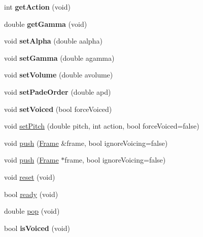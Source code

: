 \begin{DoxyCompactItemize}
\item 
\hypertarget{class_m_a_g_e_1_1_vocoder_ac0707389d3fcb19a1acc4e44ef5b2d94}{int {\bfseries get\-Action} (void)}\label{class_m_a_g_e_1_1_vocoder_ac0707389d3fcb19a1acc4e44ef5b2d94}

\item 
\hypertarget{class_m_a_g_e_1_1_vocoder_aa69d3116f7989880455766230d8af06c}{double {\bfseries get\-Gamma} (void)}\label{class_m_a_g_e_1_1_vocoder_aa69d3116f7989880455766230d8af06c}

\item 
\hypertarget{class_m_a_g_e_1_1_vocoder_a638ebd059ae6e38500f9bf0b62ffde79}{void {\bfseries set\-Alpha} (double aalpha)}\label{class_m_a_g_e_1_1_vocoder_a638ebd059ae6e38500f9bf0b62ffde79}

\item 
\hypertarget{class_m_a_g_e_1_1_vocoder_af7f2886e18a5ca7929a1031b86c1cf4b}{void {\bfseries set\-Gamma} (double agamma)}\label{class_m_a_g_e_1_1_vocoder_af7f2886e18a5ca7929a1031b86c1cf4b}

\item 
\hypertarget{class_m_a_g_e_1_1_vocoder_abe8aa23071fe0b6ba424a4f0105b3788}{void {\bfseries set\-Volume} (double avolume)}\label{class_m_a_g_e_1_1_vocoder_abe8aa23071fe0b6ba424a4f0105b3788}

\item 
\hypertarget{class_m_a_g_e_1_1_vocoder_a67cdc9e3f2f2561782944b6702fff7d1}{void {\bfseries set\-Pade\-Order} (double apd)}\label{class_m_a_g_e_1_1_vocoder_a67cdc9e3f2f2561782944b6702fff7d1}

\item 
\hypertarget{class_m_a_g_e_1_1_vocoder_a56823e2f6437744f5d2ceb2ec973b3f2}{void {\bfseries set\-Voiced} (bool force\-Voiced)}\label{class_m_a_g_e_1_1_vocoder_a56823e2f6437744f5d2ceb2ec973b3f2}

\item 
void \hyperlink{class_m_a_g_e_1_1_vocoder_ad0010897fe2f1b7ff08ff765b2c315b9}{set\-Pitch} (double pitch, int action, bool force\-Voiced=false)
\item 
void \hyperlink{class_m_a_g_e_1_1_vocoder_a090b14af5e7371412ebee3829808f2de}{push} (\hyperlink{struct_m_a_g_e_1_1_frame}{Frame} \&frame, bool ignore\-Voicing=false)
\item 
void \hyperlink{class_m_a_g_e_1_1_vocoder_a7fc53d29d82c2b6d8a4ff01650b9b4dd}{push} (\hyperlink{struct_m_a_g_e_1_1_frame}{Frame} $\ast$frame, bool ignore\-Voicing=false)
\item 
void \hyperlink{class_m_a_g_e_1_1_vocoder_aa219489f0b80f526dd97f19587b35239}{reset} (void)
\item 
bool \hyperlink{class_m_a_g_e_1_1_vocoder_af71ab9d9790777fb336354d1360b5c46}{ready} (void)
\item 
double \hyperlink{class_m_a_g_e_1_1_vocoder_a1ce94efa74a2b8f2391ddaf9443e60d7}{pop} (void)
\item 
\hypertarget{class_m_a_g_e_1_1_vocoder_a6082303317d5ce9424fc880a0e5b76c3}{bool {\bfseries is\-Voiced} (void)}\label{class_m_a_g_e_1_1_vocoder_a6082303317d5ce9424fc880a0e5b76c3}

\end{DoxyCompactItemize}
